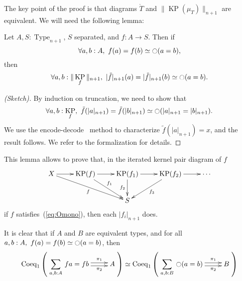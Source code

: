 \documentclass[notfinal]{jfrarticle}
\DeclareMathOperator{\Type}{Type}
\newcommand{\modal}{\ensuremath{\ocircle}}
\newcommand{\sumD}[3]{\sum_{#1:#2}\, #3}
\newcommand{\code}[1]{\texttt{#1}}
\DeclareMathOperator{\KP}{KP}
\begin{document}
The key point of the proof is that diagrams $\mathring T$ and $\|\KP(\mu_T)\|_{n+1}$
are equivalent.
We will need the following lemma:

\begin{lem}[\thethm\ (\code{OT\_Omono\_sep})]
\label{lem:Omono}
  Let $A,S:\Type_{n+1}$, $S$ separated, and $f:A \to S$. Then if 
  \begin{equation}
    \label{eq:Omono}
    \forall a,b:A,~f (a) = f (b) \simeq \modal (a=b),
  \end{equation}
  then
  \[\forall a,b:\|\KP_f\|_{n+1},~|\tilde f|_{n+1} (a) = |\tilde f|_{n+1} (b) \simeq \modal (a=b).\]
\end{lem}

\begin{proof}[(Sketch)]
  By induction on truncation, we need to show that 
  \[\forall a,b:\KP_f,~\tilde f (|a|_{n+1}) = \tilde f (|b|_{n+1} )\simeq
  \modal (|a|_{n+1}=|b|_{n+1}).\]%
  We use the encode-decode~\cite[Section 8.9]{hottbook} method to characterize $\tilde f (|a|_{n+1})
  = x$, and the result follows. We refer to the formalization for details.
\end{proof}

This lemma allows to prove that, in the iterated kernel pair diagram
of $f$
\[
  \xymatrix{
    X \ar[r] \ar[rrd]_f & \KP(f) \ar[r] \ar[rd]^{f_1} & \KP(f_1)
    \ar[r] \ar[d]_{f_2} & \KP(f_2) \ar[r] \ar[ld]^{f_3}& \cdots \\
    && S &&
  }
\]
if $f$ satisfies~(\ref{eq:Omono}), then each $|f_i|_{n+1}$ does.

\begin{rmq}
It is clear that if $A$ and $B$ are equivalent types, and for all $a,b:A,~f (a) = f (b) \simeq \modal
(a=b)$, then 
\[
    \mathrm{Coeq}_1 \left( 
      \xymatrix{
        \displaystyle{\sumD {a,b} A {f a = f b}} \ar@<-.5ex>[r]_-{\pi_2} \ar@<.5ex>[r]^-{\pi_1} & A
      }
    \right)
    \simeq \mathrm{Coeq}_1 \left( 
      \xymatrix{\displaystyle{\sumD {a,b} B {\modal (a=b)}} \ar@<-.5ex>[r]_-{\pi_2} \ar@<.5ex>[r]^-{\pi_1} & B}
    \right)
  \]
\end{rmq}
\end{document}
